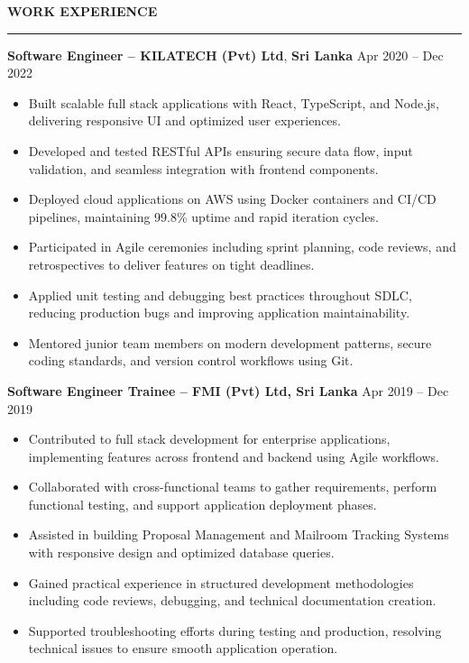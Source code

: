 \documentclass[10pt,letterpaper]{article}
\begin{document}
\vspace{8pt}

\textbf{WORK EXPERIENCE}\\[-8pt]
\noindent\rule{\textwidth}{1pt}

\vspace{-2pt}

\textbf{Software Engineer -- KILATECH (Pvt) Ltd}, \textbf{Sri Lanka} \hfill Apr 2020 -- Dec 2022

\vspace{-1pt}

\begin{itemize}
\item Built scalable full stack applications with React, TypeScript, and Node.js, delivering responsive UI and optimized user experiences.
\item Developed and tested RESTful APIs ensuring secure data flow, input validation, and seamless integration with frontend components.
\item Deployed cloud applications on AWS using Docker containers and CI/CD pipelines, maintaining 99.8\% uptime and rapid iteration cycles.
\item Participated in Agile ceremonies including sprint planning, code reviews, and retrospectives to deliver features on tight deadlines.
\item Applied unit testing and debugging best practices throughout SDLC, reducing production bugs and improving application maintainability.
\item Mentored junior team members on modern development patterns, secure coding standards, and version control workflows using Git.
\end{itemize}

\textbf{Software Engineer Trainee -- FMI (Pvt) Ltd, Sri Lanka} \hfill Apr 2019 -- Dec 2019

\vspace{-1pt}

\begin{itemize}
\item Contributed to full stack development for enterprise applications, implementing features across frontend and backend using Agile workflows.
\item Collaborated with cross-functional teams to gather requirements, perform functional testing, and support application deployment phases.
\item Assisted in building Proposal Management and Mailroom Tracking Systems with responsive design and optimized database queries.
\item Gained practical experience in structured development methodologies including code reviews, debugging, and technical documentation creation.
\item Supported troubleshooting efforts during testing and production, resolving technical issues to ensure smooth application operation.
\end{itemize}
\end{document}
